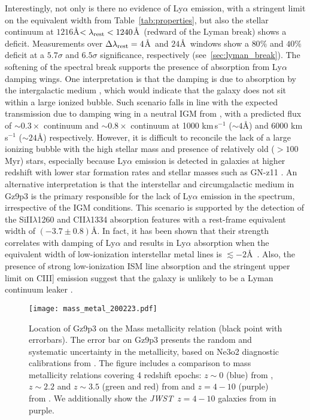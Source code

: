 \documentclass[sn-mathphys]{sn-jnl}%
\theoremstyle{thmstyleone}%
\theoremstyle{thmstyletwo}%
\theoremstyle{thmstylethree}%
\newcommand{\jwst}{\textit{JWST}}
\begin{document}
Interestingly, not only is there no evidence of Ly$\alpha$ emission, with a stringent limit on the equivalent width from Table~\ref{tab:properties}, but also the stellar continuum at $1216$\AA$< \lambda_{\rm rest} < 1240$\AA\ (redward of the Lyman break) shows a deficit. Measurements over $\Delta \lambda_{\rm rest}=4$\AA\ and $24$\AA\ windows show a $80\%$ and $40\%$ deficit at a $5.7\sigma$ and $6.5\sigma$ significance, respectively (see~\ref{sec:lyman_break}). The softening of the spectral break supports the presence of absorption from Ly$\alpha$ damping wings. One interpretation is that the damping is due to absorption by the intergalactic medium \citep{Miralda_escude98}, which would indicate that the galaxy does not sit within a large ionized bubble. Such scenario falls in line with the expected transmission due to damping wing in a neutral IGM from \cite{Mason20}, with a predicted flux of $\sim0.3\times$ continuum and $\sim0.8\times$ continuum at 1000 km\,s$^{-1}$ ($\sim4$\AA) and 6000 km\,s$^{-1}$ ($\sim24$\AA) respectively. However, it is difficult to reconcile the lack of a large ionizing bubble with the high stellar mass and presence of relatively old ($>100$ Myr) stars, especially because Ly$\alpha$ emission is detected in galaxies at higher redshift with lower star formation rates and stellar masses such as GN-z11 \cite{Bunker23}. An alternative interpretation is that the interstellar and circumgalactic medium in Gz9p3 is the primary responsible for the lack of Ly$\alpha$ emission in the spectrum, irrespective of the IGM conditions. This scenario is supported by the detection of the SiII$\lambda$1260 and CII$\lambda$1334 absorption features with a rest-frame equivalent width of $(-3.7\pm 0.8)$\AA. In fact, it has been shown that their strength correlates with damping of Ly$\alpha$ and results in Ly$\alpha$ absorption when the equivalent width of low-ionization interstellar metal lines is $\lesssim -2$\AA\ 
\cite{Jones2012,Leethochawalit2016,Pahl2020}. Also, the presence of strong low-ionization ISM line absorption and the stringent upper limit on CIII] emission suggest that the galaxy is unlikely to be a Lyman continuum leaker \cite{Lopez2022}.

\begin{figure*}
    \centering
    \texttt{[image: mass\_metal\_200223.pdf]}
    \caption{Location of Gz9p3 on the Mass metallicity relation (black point with errorbars). The error bar on Gz9p3 presents the random and systematic uncertainty in the metallicity, based on Ne3o2 diagnostic calibrations from \cite{Bian18, Shi07, Maiolino_2008, Nakajima22, Jones15}. The figure includes a comparison to mass metallicity relations covering 4 redshift epochs: $z\sim0$ (blue) from \cite{Andrews13, Maiolino_2008}, $z\sim2.2$ and $z\sim3.5$ (green and red) from \cite{Sanders21, Maiolino_2008} and $z=4-10$ (purple) from \cite{Nakajima23}. We additionally show the \jwst\ $z=4-10$ galaxies from \cite{Nakajima23} in purple.}
    \label{fig:mass_metal}
\end{figure*}
\end{document}
